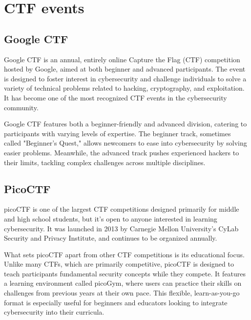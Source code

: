 \documentclass[conference]{IEEEtran}
\begin{document}



\section{CTF events}

\subsection{Google CTF}

Google CTF is an annual, entirely online Capture the Flag (CTF) competition hosted by Google,
aimed at both beginner and advanced participants. The event is designed to
foster interest in cybersecurity and challenge individuals to solve a variety
of technical problems related to hacking, cryptography, and exploitation. It
has become one of the most recognized CTF events in the cybersecurity
community.

Google CTF features both a beginner-friendly and advanced division, catering to
participants with varying levels of expertise. The beginner track, sometimes
called "Beginner's Quest," allows newcomers to ease into cybersecurity by
solving easier problems. Meanwhile, the advanced track pushes experienced
hackers to their limits, tackling complex challenges across multiple
disciplines.

\subsection{PicoCTF}

picoCTF is one of the largest CTF competitions designed
primarily for middle and high school students, but it’s open to anyone
interested in learning cybersecurity. It was launched in 2013 \cite{zhang2013}
by Carnegie Mellon
University’s CyLab Security and Privacy Institute, and continues to be organized annually.

What sets picoCTF apart from other CTF competitions is its educational focus.
Unlike many CTFs, which are primarily competitive, picoCTF is designed to teach
participants fundamental security concepts while they compete. It features a
learning environment called picoGym, where users can practice their skills on
challenges from previous years at their own pace. This flexible,
learn-as-you-go format is especially useful for beginners and educators looking
to integrate cybersecurity into their curricula.
\end{document}
